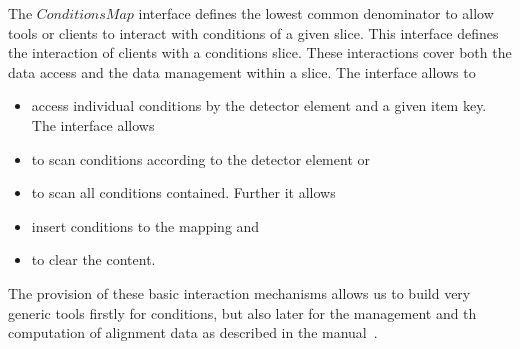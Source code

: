 \documentclass[10pt,a4paper]{article}
\begin{document}
\noindent
The $ConditionsMap$ interface defines the lowest common denominator to
allow tools or clients to interact with conditions of a given slice.
This interface defines the interaction of clients with a conditions slice.
These interactions cover both the data access and the data management 
within a slice. The interface allows to
\begin{itemize}
\item access individual conditions by the detector element
and a given item key. The interface allows
\item to scan conditions according to the detector element or 
\item to scan all conditions contained. Further it allows 
\item insert conditions to the mapping and
\item to clear the content.
\end{itemize}
The provision of these basic interaction mechanisms allows us to build
very generic tools firstly for conditions, but also later for the
management and th computation of alignment data as described in
the \DDA manual~\cite{bib:ddalign-manual}.
\end{document}
